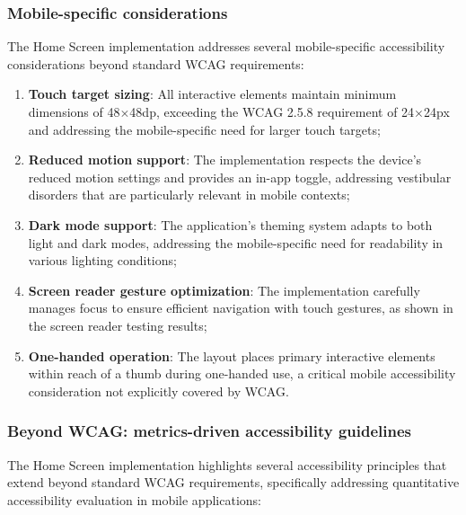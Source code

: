 \subsubsection{Mobile-specific considerations}

The Home Screen implementation addresses several mobile-specific accessibility considerations beyond standard WCAG requirements:

\begin{enumerate}
    \item \textbf{Touch target sizing}: All interactive elements maintain minimum dimensions of 48$\times$48dp, exceeding the WCAG 2.5.8 requirement of 24$\times$24px and addressing the mobile-specific need for larger touch targets;
    \item \textbf{Reduced motion support}: The implementation respects the device's reduced motion settings and provides an in-app toggle, addressing vestibular disorders that are particularly relevant in mobile contexts;
    \item \textbf{Dark mode support}: The application's theming system adapts to both light and dark modes, addressing the mobile-specific need for readability in various lighting conditions;
    \item \textbf{Screen reader gesture optimization}: The implementation carefully manages focus to ensure efficient navigation with touch gestures, as shown in the screen reader testing results;
    \item \textbf{One-handed operation}: The layout places primary interactive elements within reach of a thumb during one-handed use, a critical mobile accessibility consideration not explicitly covered by WCAG.
\end{enumerate}

\subsubsection{Beyond WCAG: metrics-driven accessibility guidelines}

The Home Screen implementation highlights several accessibility principles that extend beyond standard WCAG requirements, specifically addressing quantitative accessibility evaluation in mobile applications:

